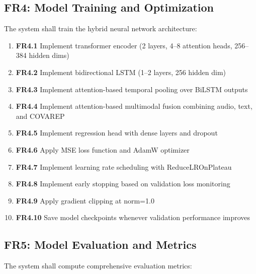 \documentclass[12pt]{article}
\begin{document}
	\subsection{FR4: Model Training and Optimization}

	The system shall train the hybrid neural network architecture:

	\begin{enumerate}
		\item \textbf{FR4.1} Implement transformer encoder (2 layers, 4--8 attention heads, 256--384 hidden dims)
		\item \textbf{FR4.2} Implement bidirectional LSTM (1--2 layers, 256 hidden dim)
		\item \textbf{FR4.3} Implement attention-based temporal pooling over BiLSTM outputs
		\item \textbf{FR4.4} Implement attention-based multimodal fusion combining audio, text, and COVAREP
		\item \textbf{FR4.5} Implement regression head with dense layers and dropout
		\item \textbf{FR4.6} Apply MSE loss function and AdamW optimizer
		\item \textbf{FR4.7} Implement learning rate scheduling with ReduceLROnPlateau
		\item \textbf{FR4.8} Implement early stopping based on validation loss monitoring
		\item \textbf{FR4.9} Apply gradient clipping at norm=1.0
		\item \textbf{FR4.10} Save model checkpoints whenever validation performance improves
	\end{enumerate}

	\subsection{FR5: Model Evaluation and Metrics}

	The system shall compute comprehensive evaluation metrics:
\end{document}
